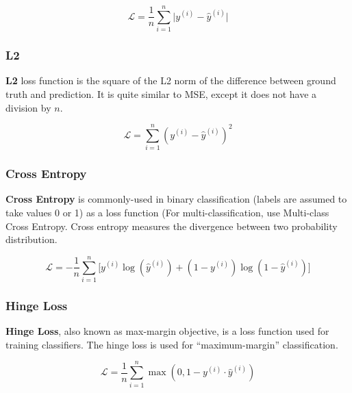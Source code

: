 \begin{equation} \label{eq:loss-mae}
	\boldsymbol{\mathcal{L}}=\frac{1}{n}\sum_{i=1}^{n}\big\lvert y^{(i)}-\hat{y}^{(i)}\big\rvert
\end{equation}


\subsubsection{L2}
\textbf{L2} loss function is the square of the L2 norm of the difference between ground truth and prediction. It is quite similar to MSE, except it does not have a division by $n$.

\begin{equation} \label{eq:loss-l2}
	\boldsymbol{\mathcal{L}}=\sum_{i=1}^{n}(y^{(i)}-\hat{y}^{(i)})^{2}
\end{equation}

\subsubsection{Cross Entropy}
\textbf{Cross Entropy} is commonly-used in binary classification (labels are assumed to take values 0 or 1) as a loss function (For multi-classification, use Multi-class Cross Entropy. Cross entropy measures the divergence between two probability distribution.

\begin{equation} \label{eq:loss-crossentropy}
	\boldsymbol{\mathcal{L}}=-\frac{1}{n}\sum_{i=1}^{n}\big[y^{(i)}\log(\hat{y}^{(i)})+(1-y^{(i)})\log(1-\hat{y}^{(i)})\big]
\end{equation}

\subsubsection{Hinge Loss}
\textbf{Hinge Loss}, also known as max-margin objective, is a loss function used for training classifiers. The hinge loss is used for “maximum-margin” classification.

\begin{equation} \label{eq:loss-hinge}
	\boldsymbol{\mathcal{L}}=\frac{1}{n}\sum_{i=1}^{n}\max(0,1-y^{(i)}\cdot\hat{y}^{(i)})
\end{equation}
